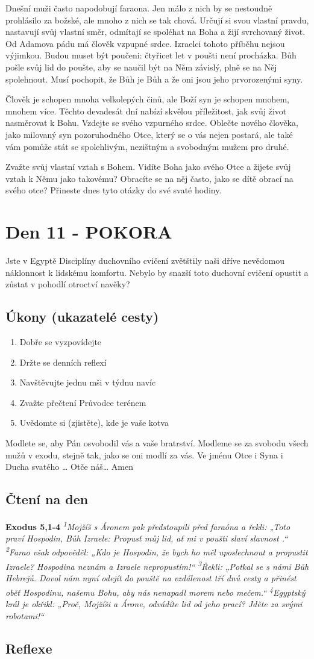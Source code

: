 \documentclass[11pt]{article}
\newcommand{\zacatekDruhyTyden}{
  Jste v Egyptě \newline
  Disciplíny duchovního cvičení zvětštily naši dříve nevědomou náklonnost k lidskému komfortu.
  Nebylo by snazší toto duchovní cvičení opustit a zůstat v pohodlí otroctví navěky?

  \subsection*{Úkony (ukazatelé cesty)}
\begin{enumerate}
  \item Dobře se vyzpovídejte
  \item Držte se denních reflexí
  \item Navštěvujte jednu mši v týdnu navíc
  \item Zvažte přečtení Průvodce terénem
  \item Uvědomte si (zjistěte), kde je vaše kotva
\end{enumerate}
Modlete se, aby Pán osvobodil vás a vaše bratrství. \newline
Modleme se za svobodu všech mužů v exodu, stejně tak, jako se oni modlí za vás.\newline
Ve jménu Otce i Syna i Ducha svatého …  Otče náš… Amen
}
\begin{document}
Dnešní muži často napodobují faraona. Jen málo z nich by se nestoudně prohlásilo za božské, ale mnoho z nich se
tak chová. Určují si svou vlastní pravdu, nastavují svůj vlastní směr, odmítají se spoléhat na Boha a žijí svrchovaný
život. Od Adamova pádu má člověk vzpupné srdce. Izraelci tohoto příběhu nejsou výjimkou. Budou muset být
poučeni: čtyřicet let v poušti není procházka. Bůh pošle svůj lid do poušte, aby se naučil být na Něm závislý, plně se
na Něj spolehnout. Musí pochopit, že Bůh je Bůh a že oni jsou jeho prvorozenými syny.

Člověk je schopen mnoha velkolepých činů, ale Boží syn je schopen mnohem, mnohem více. Těchto devadesát dní
nabízí skvělou příležitost, jak svůj život nasměrovat k Bohu. Vzdejte se svého vzpurného srdce. Oblečte nového
člověka, jako milovaný syn pozoruhodného Otce, který se o vás nejen postará, ale také vám pomůže stát se
spolehlivým, nezištným a svobodným mužem pro druhé.

Zvažte svůj vlastní vztah s Bohem. Vidíte Boha jako svého Otce a žijete svůj vztah k Němu jako takovému?
Obracíte se na něj často, jako se dítě obrací na svého otce? Přineste dnes tyto otázky do své svaté hodiny.

\newpage
\section{Den 11 - POKORA}
\zacatekDruhyTyden
\subsection*{Čtení na den}
\textbf{Exodus 5,1-4}
\newline
\textit{
\textsuperscript{1}Mojžíš s Áronem pak předstoupili před faraóna a řekli: „Toto praví Hospodin, Bůh Izraele: Propusť můj lid, ať mi v poušti slaví slavnost .“
\textsuperscript{2}Farao však odpověděl: „Kdo je Hospodin, že bych ho měl uposlechnout a propustit Izraele? Hospodina neznám a Izraele nepropustím!“
\textsuperscript{3}Řekli: „Potkal se s námi Bůh Hebrejů. Dovol nám nyní odejít do pouště na vzdálenost tří dnů cesty a přinést oběť Hospodinu, našemu Bohu, aby nás nenapadl morem nebo mečem.“
\textsuperscript{4}Egyptský král je okřikl: „Proč, Mojžíši a Árone, odvádíte lid od jeho prací? Jděte za svými robotami!“
}

\newpage
\subsection*{Reflexe}
\end{document}
